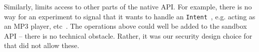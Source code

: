 Similarly, \sysname limits access to other parts 
of the native API. For example, there is no way for an experiment to 
signal that it wants to handle an \texttt{Intent}~\cite{intent}, e.g. 
acting as an MP3 player, etc~\cite{intent-dev}.
The operations above 
could well be added to the sandbox API -- there is no technical 
obstacle. Rather, it was our security design 
choice for \sysname that did not allow these.
